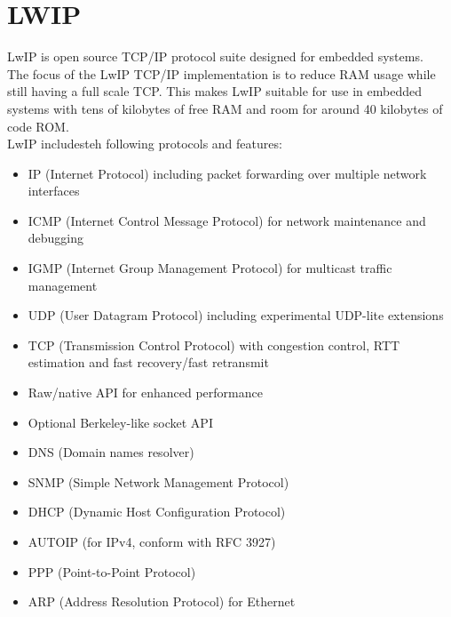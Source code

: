 \chapter{LWIP}
LwIP is open source TCP/IP protocol suite designed for embedded systems.\\
The focus of the LwIP TCP/IP implementation is to reduce RAM usage while still
having a full scale TCP. This makes LwIP
suitable for use in embedded systems with tens of kilobytes of free RAM and room
for around 40 kilobytes of code ROM.\\
LwIP includesteh following protocols and features:\\
\begin{itemize}
	\item IP (Internet Protocol) including packet forwarding over multiple network interfaces
  \item ICMP (Internet Control Message Protocol) for network maintenance and debugging
  \item IGMP (Internet Group Management Protocol) for multicast traffic management
  \item UDP (User Datagram Protocol) including experimental UDP-lite extensions
  \item TCP (Transmission Control Protocol) with congestion control, RTT estimation and fast recovery/fast retransmit
  \item Raw/native API for enhanced performance
  \item Optional Berkeley-like socket API
  \item DNS (Domain names resolver)
  \item SNMP (Simple Network Management Protocol)
  \item DHCP (Dynamic Host Configuration Protocol)
  \item AUTOIP (for IPv4, conform with RFC 3927)
  \item PPP (Point-to-Point Protocol)
  \item ARP (Address Resolution Protocol) for Ethernet 
\end{itemize}



